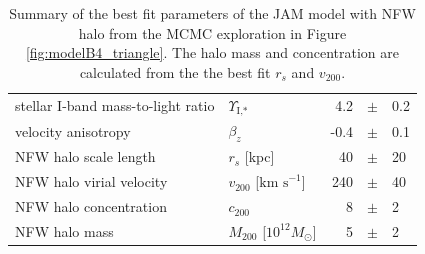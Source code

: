 \begin{table}
\centering
\begin{tabular}{llrcl}
\hline
stellar I-band mass-to-light ratio & $\Upsilon_\text{I,*}$ & 4.2 & $\pm$ & 0.2\\
velocity anisotropy & $\beta_z$ & -0.4 & $\pm$ & 0.1 \\
NFW halo scale length & $r_s$ [kpc] & 40 & $\pm$ & 20\\
NFW halo virial velocity & $v_{200}$ [$\text{km s}^{-1}$] & 240 & $\pm$ & 40\\
NFW halo concentration & $c_{200}$ & 8 & $\pm$ & 2 \\
NFW halo mass & $M_{200}$ [$10^{12} M_\odot$] & 5 & $\pm$ & 2\\
\hline
\end{tabular}
\caption{Summary of the best fit parameters of the JAM model with NFW halo from the MCMC exploration in Figure \ref{fig:modelB4_triangle}. The halo mass and concentration are calculated from the the best fit $r_s$ and $v_{200}$.}
\label{tab:modelB4_bestfit}
\end{table}


